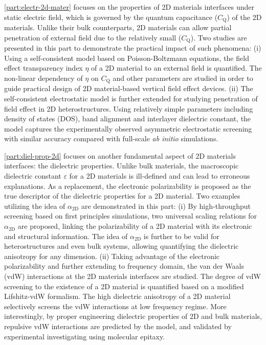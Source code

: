 \autoref{part:electr-2d-mater} focuses on the properties of 2D
materials interfaces under static electric field, which is governed by
the quantum capacitance ($C_{\mathrm{Q}}$) of the 2D materials.
%
Unlike their bulk
counterparts, 2D materials can allow partial penetration of external
field due to the relatively small ($C_{\mathrm{Q}}$).
%
Two studies are
presented in this part to demonstrate the practical impact of such
phenomena:
%
(i) Using a self-consistent model based on
Poisson-Boltzmann equations, the field effect transparency index
$\eta$ of a 2D material to an external field is quantified. The
non-linear dependency of $\eta$ on $C_{\mathrm{Q}}$ and other
parameters are studied in order to guide practical design of 2D
material-based vertical field effect devices.
%
(ii) The self-consistent
electrostatic model is further extended for studying penetration of
field effect in 2D heterostructures. Using relatively simple
parameters including density of states (DOS), band alignment and
interlayer dielectric constant, the model captures the experimentally observed asymmetric
electrostatic screening with similar accuracy compared with full-scale
\textit{ab initio} simulations.

\autoref{part:diel-prop-2d} focuses on another fundamental aspect of 2D materials
interfaces: the dielectric properties.
%
Unlike bulk materials, the
macroscopic dielectric constant $\varepsilon$ for a 2D materials is
ill-defined and can lead to erroneous explanations.
%
As a replacement,
the electronic polarizability is proposed as the true descriptor of
the dielectric properties for a 2D material.
%
Two examples utilizing the idea of $\alpha_{\mathrm{2D}}$ are
demonstrated in this part:
%
(i) By high-throughput screening based on first principles
simulations, two universal scaling relations for
$\alpha_{\mathrm{2D}}$ are proposed, linking the polarizability of a
2D material with its electronic and structural information.
%
The idea
of $\alpha_{\mathrm{2D}}$ is further to be valid for heterostructures
and even bulk systems, allowing quantifying the dielectric anisotropy
for any dimension.
%
(ii) Taking advantage of the electronic polarizability and further
extending to frequency domain, the van der Waals (vdW) interactions at
the 2D materials interfaces are studied. The degree of vdW screening
to the existence of a 2D material is quantified based on a modified
Lifshitz-vdW formalism. The high dielectric anisotropy of a 2D
material selectively screens the vdW interactions at low frequency
regime. More interestingly, by proper engineering dielectric
properties of 2D and bulk materials, repulsive vdW interactions are
predicted by the model, and validated by experimental investigating
using molecular epitaxy.

